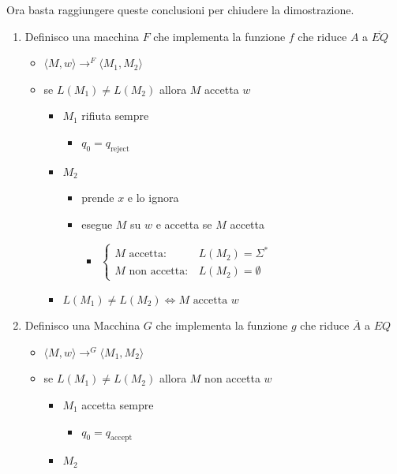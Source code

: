 \documentclass[11pt]{article}
\begin{document}
\begin{enumerate}
Ora basta raggiungere queste conclusioni per chiudere la dimostrazione.
\begin{enumerate}
\item Definisco una macchina \(F\) che implementa la funzione \(f\) che riduce \(A\) a \(\overline{EQ}\)
\begin{itemize}
\item \(\langle M, w \rangle \rightarrow^{F} \langle M_{1}, M_{2} \rangle\)
\item se \(L(M_{1}) \neq L(M_{2})\) allora \(M\) accetta \(w\)
\begin{itemize}
\item \(M_{1}\) rifiuta sempre
\begin{itemize}
\item \(q_{0} = q_{\text{reject}}\)
\end{itemize}
\item \(M_{2}\)
\begin{itemize}
\item prende \(x\) e lo ignora
\item esegue \(M\) su \(w\) e accetta se \(M\) accetta
\begin{itemize}
\item \(\begin{cases} M \mbox{ accetta}: & L(M_{2})=\Sigma^{*}\\M \mbox{ non accetta}: & L(M_{2}) = \emptyset  \end{cases}\)
\end{itemize}
\end{itemize}
\item \(L(M_{1}) \neq L(M_{2}) \iff M \mbox{ accetta }w\)
\end{itemize}
\end{itemize}
\item Definisco una Macchina \(G\) che implementa la funzione \(g\) che riduce \(\overline A\) a \(EQ\)
\begin{itemize}
\item \(\langle M, w \rangle \rightarrow^{G} \langle M_{1}, M_{2} \rangle\)
\item se \(L(M_{1}) \neq L(M_{2})\) allora \(M\) non accetta \(w\)
\begin{itemize}
\item \(M_{1}\) accetta sempre
\begin{itemize}
\item \(q_{0} = q_{\text{accept}}\)
\end{itemize}
\item \(M_{2}\)
\begin{itemize}

\end{itemize}
\end{itemize}
\end{itemize}
\end{enumerate}
\end{enumerate}
\end{document}

